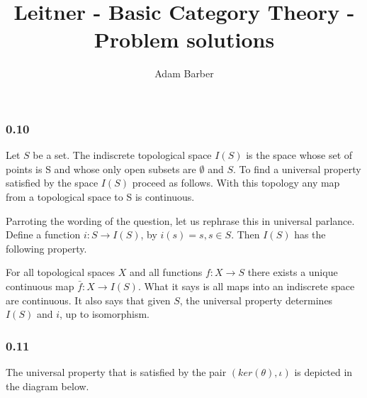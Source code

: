 \documentclass{article}
\begin{document}
\title{Leitner - Basic Category Theory - Problem solutions}
\author{Adam Barber}

\maketitle
\subsubsection*{0.10}

Let $S$ be a set. The indiscrete topological space $I(S)$ is the space whose set of points is S and whose only open subsets are $\emptyset$ and $S$.
To find a universal property satisfied by the space $I(S)$ proceed as follows.
With this topology any map from a topological space to S is continuous.

Parroting the wording of the question, let us rephrase this in
universal parlance. Define a function $i\colon S \rightarrow I(S)$, by $i(s) = s, s \in S$.
Then $I(S)$ has the following property.


\begin{center}
\end{center}

For all topological spaces $X$ and all functions
$f\colon X \rightarrow S$ there exists a unique continuous map $\bar{f}\colon X \rightarrow I(S)$. What it says is all maps into an indiscrete space are continuous. It also says that given $S$, the universal property determines $I(S)$ and $i$, up to isomorphism.

\subsubsection*{0.11}

The universal property that is satisfied by the pair $(ker(\theta),\iota)$ is depicted in the diagram below.

\begin{center}
\end{center}
\end{document}
